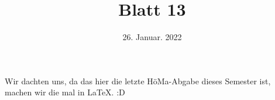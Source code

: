 

\subject{HöMa 3}
\title{Blatt 13}
\date{%
  26. Januar. 2022
}



\maketitle
\thispagestyle{empty}
\tableofcontents
\newpage

Wir dachten uns, da das hier die letzte HöMa-Abgabe dieses Semester ist, machen wir die mal in \LaTeX. :D




\printbibliography{}


